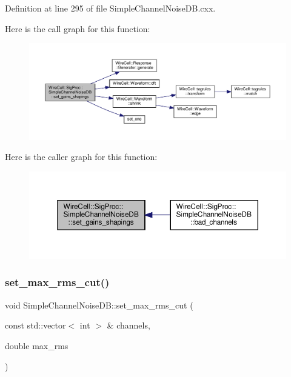 Definition at line 295 of file Simple\+Channel\+Noise\+D\+B.\+cxx.

Here is the call graph for this function\+:
\nopagebreak
\begin{figure}[H]
\begin{center}
\leavevmode
\includegraphics[width=350pt]{class_wire_cell_1_1_sig_proc_1_1_simple_channel_noise_d_b_a82e2e7cf205e61e1ab1e7970aa6655cb_cgraph}
\end{center}
\end{figure}
Here is the caller graph for this function\+:
\nopagebreak
\begin{figure}[H]
\begin{center}
\leavevmode
\includegraphics[width=350pt]{class_wire_cell_1_1_sig_proc_1_1_simple_channel_noise_d_b_a82e2e7cf205e61e1ab1e7970aa6655cb_icgraph}
\end{center}
\end{figure}
\mbox{\label{class_wire_cell_1_1_sig_proc_1_1_simple_channel_noise_d_b_a1a5c77d29d9f65e62ce9a811c80ebaca}} 
\subsubsection{\texorpdfstring{set\+\_\+max\+\_\+rms\+\_\+cut()}{set\_max\_rms\_cut()}}
{\footnotesize\ttfamily void Simple\+Channel\+Noise\+D\+B\+::set\+\_\+max\+\_\+rms\+\_\+cut (\begin{DoxyParamCaption}\item[{const std\+::vector$<$ int $>$ \&}]{channels,  }\item[{double}]{max\+\_\+rms }\end{DoxyParamCaption})}



